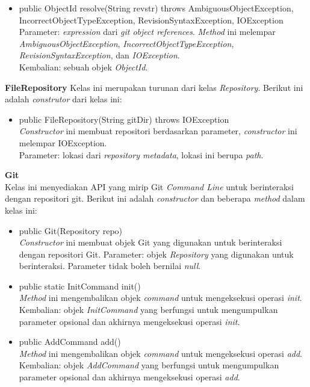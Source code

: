 \documentclass[a4paper,twoside]{article}
\begin{document}
\begin{enumerate}
\begin{itemize}
\item public ObjectId resolve(String revstr) throws AmbiguousObjectException, IncorrectObjectTypeException, RevisionSyntaxException, IOException\\
Parameter: \textit{expression} dari \textit{git object references}. \textit{Method} ini melempar \textit{AmbiguousObjectException}, \textit{IncorrectObjectTypeException}, \textit{RevisionSyntaxException}, dan \textit{IOException}.\\
Kembalian: sebuah objek \textit{ObjectId}.
\end{itemize} 

\textbf{FileRepository}
Kelas ini merupakan turunan dari kelas \textit{Repository}. Berikut ini adalah \textit{construtor} dari kelas ini:
\begin{itemize}
\item public FileRepository(String gitDir) throws IOException\\
\textit{Constructor} ini membuat repositori berdasarkan parameter, \textit{constructor} ini melempar IOException.\\
Parameter: lokasi dari \textit{repository metadata}, lokasi ini berupa \textit{path}.
\end{itemize}

\textbf{Git}\\
Kelas ini menyediakan API yang mirip Git \textit{Command Line} untuk berinteraksi dengan repositori git. Berikut ini adalah \textit{constructor} dan beberapa \textit{method} dalam kelas ini:
\begin{itemize}
\item public Git(Repository repo)\\
\textit{Constructor} ini membuat objek Git yang digunakan untuk berinteraksi dengan repositori Git.
Parameter: objek \textit{Repository} yang digunakan untuk berinteraksi. Parameter tidak boleh bernilai \textit{null}. 

\item public static InitCommand init()\\
\textit{Method} ini mengembalikan objek \textit{command} untuk mengeksekusi operasi \textit{init}.\\
Kembalian: objek \textit{InitCommand} yang berfungsi untuk mengumpulkan parameter opsional dan akhirnya mengeksekusi operasi \textit{init}.

\item public AddCommand add()\\
\textit{Method} ini mengembalikan objek \textit{command} untuk mengeksekusi operasi \textit{add}.\\
Kembalian: objek \textit{AddCommand} yang berfungsi untuk mengumpulkan parameter opsional dan akhirnya mengeksekusi operasi \textit{add}.


\end{itemize}
\end{enumerate}
\end{document}
